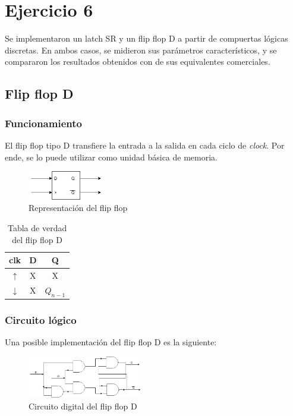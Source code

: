 \documentclass[../../e3_tp2_main.tex]{subfiles}
\begin{document}
\section{Ejercicio 6}

Se implementaron un latch SR y un flip flop D a partir de compuertas lógicas discretas. En ambos casos, se midieron sus parámetros característicos, y se compararon los resultados obtenidos con de sus equivalentes comerciales.
\subsection{Flip flop D}
\subsubsection{Funcionamiento}
El flip flop tipo D transfiere la entrada a la salida en cada ciclo de \textit{clock}. Por ende, se lo puede utilizar como unidad básica de memoria.
\begin{figure}[H]	
	\centering
	\includegraphics[width=0.3\textwidth]{imagenes/ffd_b.png}
	\caption{Representaci\'on del flip flop}
\end{figure}

\begin{table}[H]
\begin{center}
\begin{tabular}{|c|c|c|}
\hline
clk& D & Q\\
\hline \hline
$\uparrow$ & X & X \\ \hline
$\downarrow$ &X  &$Q_{n-1}$ \\ \hline
\end{tabular}
\caption{Tabla de verdad del flip flop D} 
\end{center}
\end{table}

\subsubsection{Circuito lógico}
Una posible implementación del flip flop D es la siguiente:
\begin{figure}[H]	
	\centering
	\includegraphics[width=0.45\textwidth]{imagenes/ffd_cd.png}
	\caption{Circuito digital del flip flop D}
\end{figure}
\end{document}
